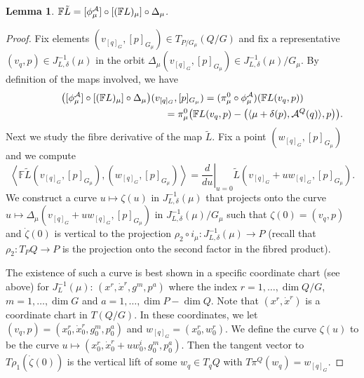 \documentclass[11pt]{article}
\newtheorem{lemma}{Lemma}
\newcommand{\A}{{\cal A}}
\newcommand{\F}{\mathbb{F}}
\begin{document}
\begin{lemma}\label{lem:legendre}
  $\F \tilde L=[\phi^\A_\mu]\circ[(\F L)_\mu]\circ\Delta_\mu$.
\end{lemma}
\begin{proof}
Fix elements $(v_{[q]_G},[p]_{G_\mu})\in T_{P/G_\mu}(Q/G)$ and f\/ix a representative $(v_q,p)\in J^{-1}_{L,\delta}(\mu)$ in the orbit $\Delta_\mu(v_{[q]_G},[p]_{G_\mu})\in J^{-1}_{L,\delta}(\mu)/G_\mu$. By def\/inition of the maps involved, we have
\begin{gather*}
\big([\phi^\A_\mu]\circ[(\F L)_\mu]\circ\Delta_\mu\big)(v_{[q]_G},[p]_{G_\mu})   = (\pi^0_\mu \circ \phi^\A_\mu)(\F L(v_q,p))\\
 \phantom{\big([\phi^\A_\mu]\circ[(\F L)_\mu]\circ\Delta_\mu\big)(v_{[q]_G},[p]_{G_\mu})}{}
 = \pi^0_\mu\big(\F L(v_q,p)-\big(\langle \mu+\delta(p),\A^Q(q)\rangle,p\big)\big).
\end{gather*}
Next we study the f\/ibre derivative of the map $\tilde L$.  Fix a point $(w_{[q]_G},[p]_{G_\mu})$ and we compute
\[
\left\langle \F\tilde L (v_{[q]_G},[p]_{G_\mu}) , (w_{[q]_G},[p]_{G_\mu})\right\rangle=\left. \frac{d}{du}\right|_{u=0}\tilde L (v_{[q]_G}+u w_{[q]_G},[p]_{G_\mu}).
\]
We construct a curve $u\mapsto \zeta(u)$ in $J^{-1}_{L,\delta}(\mu)$ that projects onto the curve $u\mapsto\Delta_\mu(v_{[q]_G}+u w_{[q]_G},[p]_{G_\mu})$ in $J^{-1}_{L,\delta}(\mu)/G_\mu$ such that $\zeta(0)=(v_q,p)$ and $\dot \zeta(0)$ is vertical to the projection $\rho_2\circ i_\mu:J^{-1}_{L,\delta}(\mu)\to P$ (recall that $\rho_2: T_PQ\to P$ is the projection onto the second factor in the f\/ibred product).

The existence of such a curve is best shown in a specif\/ic coordinate chart (see above) for $J^{-1}_L(\mu)$: $(x^r,\dot x^r, g^m,p^a)$  where the index $r=1,\ldots,\dim Q/G$, $m=1,\ldots,\dim G$ and $a=1,\ldots ,\dim P-\dim Q$. Note that $(x^r,\dot x^r)$ is a coordinate chart in $T(Q/G)$.
In these coordinates, we let $(v_q,p)=(x^r_0,\dot x^r_0,g^m_0,p^a_0)$ and $w_{[q]_G}=(x^r_0, w^r_0)$. We def\/ine the curve $\zeta(u)$ to be the curve $u\mapsto (x^r_0,\dot x^r_0+u w^i_0,g^m_0,p^a_0)$. Then the tangent vector to $T\rho_1(\dot \zeta(0))$ is the vertical lift of some $w_q\in T_qQ$ with $T\pi^Q(w_q)=w_{[q]_G}$.


\end{proof}
\end{document}
